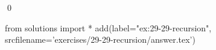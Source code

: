 
\begin{ex}
  \label{ex:29-29-recursion}
  
  \qed
\end{ex}
\begin{python0}
from solutions import *
add(label="ex:29-29-recursion",
    srcfilename='exercises/29-29-recursion/answer.tex')
\end{python0}
